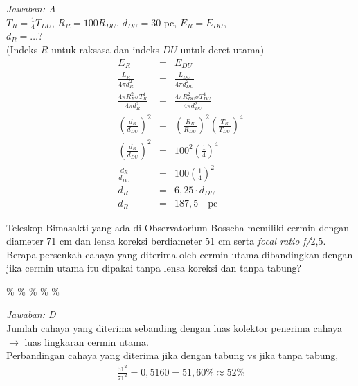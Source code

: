 \documentclass[11pt,fleqn, a4paper]{exam}
\begin{document}
\begin{questions}
\textit{Jawaban: A}\\
$T_R=\frac{1}{4}T_{DU}$, $R_R=100R_{DU}$, $d_{DU}=30$ pc, $E_R=E_{DU}$,\\
$d_R = \ldots ?$\\
(Indeks $R$ untuk raksasa dan indeks $DU$ untuk deret utama)
\begin{eqnarray*}
E_R &=& E_{DU}\\
\frac{L_R}{4\pi d_R^2} &=& \frac{L_{DU}}{4\pi d_{DU}^2}\\
\frac{4\pi R_R^2\sigma T_R^4}{4\pi d_R^2} &=& \frac{4\pi R_{DU}^2\sigma T_{DU}^4}{4\pi d_{DU}^2}\\
\left(\frac{d_R}{d_{DU}}\right)^2 &=& \left(\frac{R_R}{R_{DU}}\right)^2\left(\frac{T_R}{T_{DU}}\right)^4\\
\left(\frac{d_R}{d_{DU}}\right)^2 &=& 100^2\left(\frac{1}{4}\right)^4\\
\frac{d_R}{d_{DU}} &=& 100\left(\frac{1}{4}\right)^2\\
d_R &=& 6,25 \cdot d_{DU}\\
d_R &=& 187,5 \quad \text{pc}
\end{eqnarray*}


\vspace{0.5cm}
\question Teleskop Bimasakti yang ada di Observatorium Bosscha memiliki cermin dengan diameter 71 cm dan lensa koreksi berdiameter 51 cm serta \textit{focal ratio} \textit{f/}2,5. Berapa persenkah cahaya yang diterima oleh cermin utama dibandingkan dengan jika cermin utama itu dipakai tanpa lensa koreksi dan tanpa tabung?
\begin{choices}
\%
\%
\%
\%
\%
\end{choices}

\textit{Jawaban: D}\\
Jumlah cahaya yang diterima sebanding dengan luas kolektor penerima cahaya $\rightarrow$ luas lingkaran cermin utama.\\
Perbandingan cahaya yang diterima jika dengan tabung vs jika tanpa tabung,
\begin{eqnarray*}
\frac{51^2}{71^2} = 0,5160 = 51,60\% \approx 52\%
\end{eqnarray*}
 


\end{questions}
\end{document}
